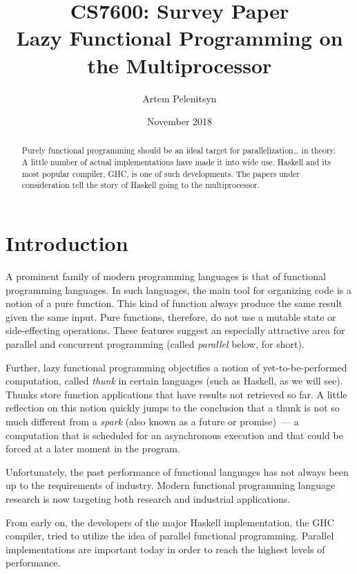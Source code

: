 \documentclass[11pt]{extarticle}
\title{CS7600: Survey Paper\\Lazy Functional Programming on the Multiprocessor}
\author{Artem Pelenitsyn}
\date{November 2018}
\begin{document}
\maketitle

\begin{abstract}
Purely functional programming should be an ideal target for parallelization… in theory. A little number of actual implementations have made it into wide use. Haskell and its most popular compiler, GHC, is one of such developments. The papers under consideration tell the story of Haskell going to the multiprocessor.
\end{abstract}


\section{Introduction}

A prominent family of modern programming languages is that of functional programming languages. In such languages, the main tool for organizing code is a notion of a pure function. This kind of function always produce the same result given the same input. Pure functions, therefore, do not use a mutable state or side-effecting operations. These features suggest an especially attractive area for parallel and concurrent programming (called \textit{parallel} below, for short).

Further, lazy functional programming objectifies a notion of yet-to-be-performed computation, called \emph{thunk} in certain languages (such as Haskell, as we will see). Thunks store function applications that have results not retrieved so far. A little reflection on this notion quickly jumps to the conclusion that a thunk is not so much different from a \emph{spark} (also known as a future or promise)~--- a computation that is scheduled for an asynchronous execution and that could be forced at a later moment in the program.

Unfortunately, the past performance of functional languages has not always been up to the requirements of industry.
Modern functional programming language research is now targeting both research and industrial applications.

From early on, the developers of the major Haskell implementation, the GHC compiler, tried to utilize the idea of parallel functional programming.
Parallel implementations are important today in order to reach the highest levels of performance. 
\end{document}
